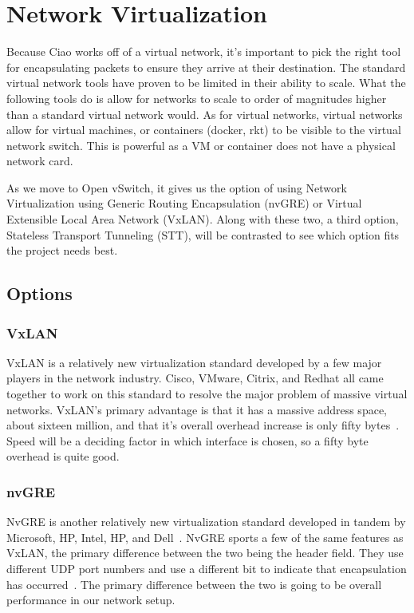 \documentclass[10pt,letterpaper,onecolumn,journal]{IEEEtran}
\begin{document}

\section{Network Virtualization}
Because Ciao works off of a virtual network, it's important to pick the right
tool for encapsulating packets to ensure they arrive at their destination. The
standard virtual network tools have proven to be limited in their ability to
scale. What the following tools do is allow for networks to scale to order of
magnitudes higher than a standard virtual network would. As for virtual networks, 
virtual networks allow for virtual machines, or containers (docker, rkt) to be
visible to the virtual network switch. This is powerful as a VM or container
does not have a physical network card.

As we move to Open vSwitch, it gives us the option of using Network
Virtualization using Generic Routing Encapsulation (nvGRE) or Virtual Extensible
Local Area Network (VxLAN). Along with these two, a third option, Stateless
Transport Tunneling (STT), will be contrasted to see which option fits the
project needs best.

\subsection{Options}
\subsubsection{VxLAN}
VxLAN is a relatively new virtualization standard developed by a few major
players in the network industry. Cisco, VMware, Citrix, and Redhat all came
together to work on this standard to resolve the major problem of massive
virtual networks. VxLAN's primary advantage is that it has a massive address
space, about sixteen million, and that it's overall overhead increase is only
fifty bytes~\cite{vxlan}. Speed will be a deciding factor in which interface
is chosen, so a fifty byte overhead is quite good.

\subsubsection{nvGRE}
NvGRE is another relatively new virtualization standard developed in tandem by
Microsoft, HP, Intel, HP, and Dell~\cite{nvgre-info}. NvGRE sports a few of the
same features as VxLAN, the primary difference between the two being the header
field. They use different UDP port numbers and use a different bit to indicate
that encapsulation has occurred~\cite{nvgre}. The primary difference between the
two is going to be overall performance in our network setup.
\end{document}
